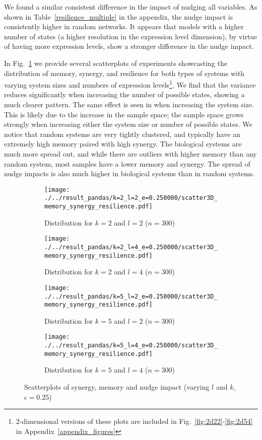 \documentclass[../main.tex]{subfiles}
\begin{document}
We found a similar consistent difference in the impact of nudging all variables.
As shown in Table~\ref{resilience_multiple} in the appendix, the nudge impact is consistently higher in random networks.
It appears that models with a higher number of states (a higher resolution in the expression level dimension), by virtue of having more expression levels, show a stronger difference in the nudge impact.

In Fig.~\ref{fig:3dscatter} we provide several scatterplots of experiments showcasting the distribution of memory, synergy, and resilience for both types of systems with varying system sizes and numbers of expression levels\footnote{2-dimensional versions of these plots are included in Fig.~\ref{fig:2d22}-\ref{fig:2d54} in Appendix~\ref{appendix_figures}}.
We find that the variance reduces significantly when increasing the number of possible states, showing a much clearer pattern.
The same effect is seen in when increasing the system size.
This is likely due to the increase in the sample space; the sample space grows strongly when increasing either the system size or number of possible states.
We notice that random systems are very tightly clustered, and typically have an extremely high memory paired with high synergy.
The biological systems are much more spread out, and while there are outliers with higher memory than any random system, most samples have a lower memory and synergy.
The spread of nudge impacts is also much higher in biological systems than in random systems.

\begin{figure}[H]
    \centering
    \begin{subfigure}[b]{0.45\textwidth}
        \texttt{[image: ./../result\_pandas/k=2\_l=2\_e=0.250000/scatter3D\_memory\_synergy\_resilience.pdf]}
        \caption{Distribution for $k=2$ and $l=2$ ($n=300$)}
    \end{subfigure}
    \begin{subfigure}[b]{0.45\textwidth}
        \texttt{[image: ./../result\_pandas/k=2\_l=4\_e=0.250000/scatter3D\_memory\_synergy\_resilience.pdf]}
        \caption{Distribution for $k=2$ and $l=4$ ($n=300$)}
    \end{subfigure}
\bigskip
    \begin{subfigure}[b]{0.45\textwidth}
        \texttt{[image: ./../result\_pandas/k=5\_l=2\_e=0.250000/scatter3D\_memory\_synergy\_resilience.pdf]}
        \caption{Distribution for $k=5$ and $l=2$ ($n=300$)}
    \end{subfigure}
    \begin{subfigure}[b]{0.45\textwidth}
        \texttt{[image: ./../result\_pandas/k=5\_l=4\_e=0.250000/scatter3D\_memory\_synergy\_resilience.pdf]}
        \caption{Distribution for $k=5$ and $l=4$ ($n=300$)}
    \end{subfigure}
    \caption{Scatterplots of synergy, memory and nudge impact (varying $l$ and $k$, $\epsilon = 0.25$)}
    \label{fig:3dscatter}
\end{figure}
\end{document}
